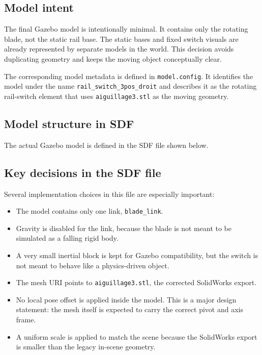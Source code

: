 \documentclass[11pt,a4paper]{article}
\begin{document}
\subsection{Model intent}
The final Gazebo model is intentionally minimal. It contains only the rotating blade, not the static rail base. The static bases and fixed switch visuals are already represented by separate models in the world. This decision avoids duplicating geometry and keeps the moving object conceptually clear.

The corresponding model metadata is defined in \texttt{model.config}. It identifies the model under the name \texttt{rail\_switch\_3pos\_droit} and describes it as the rotating rail-switch element that uses \texttt{aiguillage3.stl} as the moving geometry.



\subsection{Model structure in SDF}
The actual Gazebo model is defined in the SDF file shown below.



\subsection{Key decisions in the SDF file}
Several implementation choices in this file are especially important:
\begin{itemize}
\item The model contains only one link, \texttt{blade\_link}.
\item Gravity is disabled for the link, because the blade is not meant to be simulated as a falling rigid body.
\item A very small inertial block is kept for Gazebo compatibility, but the switch is not meant to behave like a physics-driven object.
\item The mesh URI points to \texttt{aiguillage3.stl}, the corrected SolidWorks export.
\item No local pose offset is applied inside the model. This is a major design statement: the mesh itself is expected to carry the correct pivot and axis frame.
\item A uniform scale is applied to match the scene because the SolidWorks export is smaller than the legacy in-scene geometry.
\end{itemize}
\end{document}
